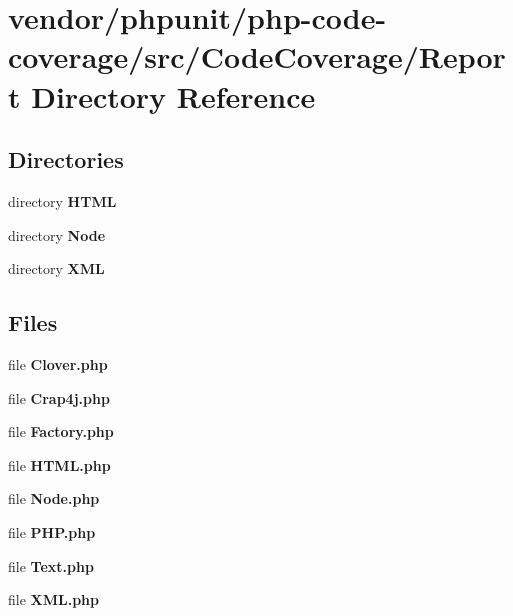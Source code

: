 \section{vendor/phpunit/php-\/code-\/coverage/src/\+Code\+Coverage/\+Report Directory Reference}
\label{dir_6b4618059e08c91df40c5f35d04c2648}
\subsection*{Directories}
\begin{DoxyCompactItemize}
\item 
directory {\bf H\+T\+M\+L}
\item 
directory {\bf Node}
\item 
directory {\bf X\+M\+L}
\end{DoxyCompactItemize}
\subsection*{Files}
\begin{DoxyCompactItemize}
\item 
file {\bf Clover.\+php}
\item 
file {\bf Crap4j.\+php}
\item 
file {\bf Factory.\+php}
\item 
file {\bf H\+T\+M\+L.\+php}
\item 
file {\bf Node.\+php}
\item 
file {\bf P\+H\+P.\+php}
\item 
file {\bf Text.\+php}
\item 
file {\bf X\+M\+L.\+php}
\end{DoxyCompactItemize}
